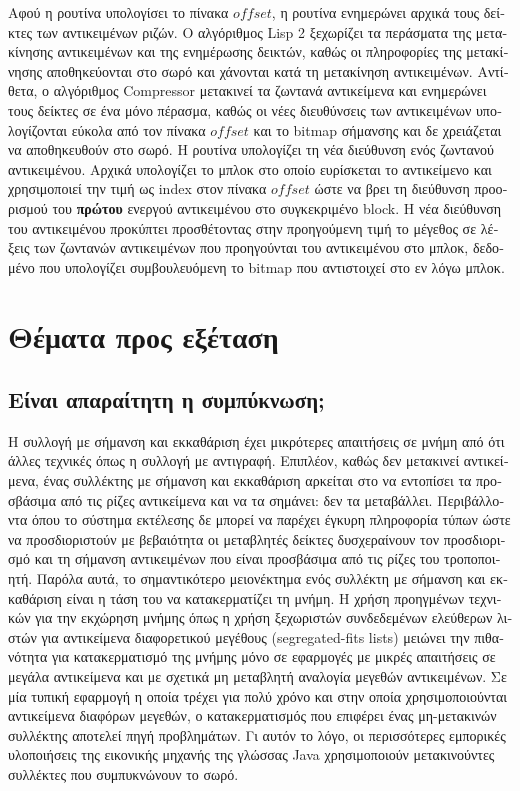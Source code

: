 \begin{greek}
Αφού η ρουτίνα \textenglish{} υπολογίσει το πίνακα $offset$, η 
ρουτίνα \textenglish{} ενημερώνει αρχικά τους δείκτες των 
αντικειμένων ριζών. Ο αλγόριθμος Lisp 2 ξεχωρίζει τα περάσματα της μετακίνησης
αντικειμένων και της ενημέρωσης δεικτών, καθώς οι πληροφορίες της μετακίνησης
αποθηκεύονται στο σωρό και χάνονται κατά τη μετακίνηση αντικειμένων. Αντίθετα,
ο αλγόριθμος Compressor μετακινεί τα ζωντανά αντικείμενα και ενημερώνει τους
δείκτες σε ένα μόνο πέρασμα, καθώς οι νέες διευθύνσεις των αντικειμένων
υπολογίζονται εύκολα από τον πίνακα $offset$ και το bitmap σήμανσης και δε
χρειάζεται να αποθηκευθούν στο σωρό. Η ρουτίνα \textenglish{} υπολογίζει
τη νέα διεύθυνση ενός ζωντανού αντικειμένου. Αρχικά υπολογίζει το
μπλοκ στο οποίο ευρίσκεται το αντικείμενο και χρησιμοποιεί την τιμή ως index
στον πίνακα $offset$ ώστε να βρει τη διεύθυνση προορισμού του \textbf{πρώτου}
ενεργού αντικειμένου στο συγκεκριμένο block. Η νέα διεύθυνση του αντικειμένου
προκύπτει προσθέτοντας στην προηγούμενη τιμή το μέγεθος σε λέξεις των ζωντανών
αντικειμένων που προηγούνται του αντικειμένου στο μπλοκ, δεδομένο που υπολογίζει
συμβουλευόμενη το bitmap που αντιστοιχεί στο εν λόγω μπλοκ.

\section{Θέματα προς εξέταση}
\subsection{Είναι απαραίτητη η συμπύκνωση;}
Η συλλογή με σήμανση και εκκαθάριση έχει μικρότερες απαιτήσεις σε μνήμη από ότι 
άλλες τεχνικές όπως η συλλογή με αντιγραφή. Επιπλέον, καθώς δεν μετακινεί 
αντικείμενα, ένας συλλέκτης με σήμανση και εκκαθάριση αρκείται στο να εντοπίσει 
τα προσβάσιμα από τις ρίζες αντικείμενα και να τα σημάνει: δεν τα μεταβάλλει. 
Περιβάλλοντα όπου το σύστημα εκτέλεσης δε μπορεί να παρέχει έγκυρη πληροφορία 
τύπων ώστε να προσδιοριστούν με βεβαιότητα οι μεταβλητές δείκτες δυσχεραίνουν 
τον προσδιορισμό και τη σήμανση αντικειμένων που είναι προσβάσιμα από τις ρίζες 
του τροποποιητή. Παρόλα αυτά, το σημαντικότερο μειονέκτημα ενός συλλέκτη με σήμανση 
και εκκαθάριση είναι η τάση του να κατακερματίζει τη μνήμη. Η χρήση προηγμένων 
τεχνικών για την εκχώρηση μνήμης όπως η χρήση ξεχωριστών συνδεδεμένων ελεύθερων λιστών 
για αντικείμενα διαφορετικού μεγέθους (segregated-fits lists) μειώνει την 
πιθανότητα για κατακερματισμό της μνήμης μόνο σε εφαρμογές με μικρές απαιτήσεις σε 
μεγάλα αντικείμενα και με σχετικά μη μεταβλητή αναλογία μεγεθών αντικειμένων. Σε 
μία τυπική εφαρμογή η οποία τρέχει για πολύ χρόνο και στην οποία χρησιμοποιούνται 
αντικείμενα διαφόρων μεγεθών, ο κατακερματισμός που επιφέρει ένας μη-μετακινών 
συλλέκτης αποτελεί πηγή προβλημάτων. Γι αυτόν το λόγο, οι περισσότερες εμπορικές 
υλοποιήσεις της εικονικής μηχανής της γλώσσας Java χρησιμοποιούν μετακινούντες 
συλλέκτες που συμπυκνώνουν το σωρό.


\end{greek}
